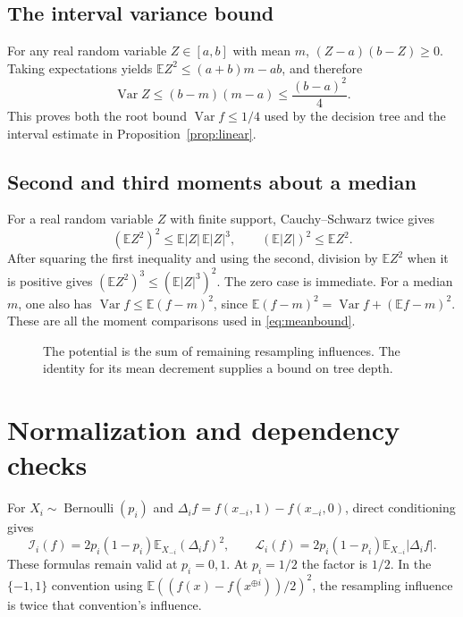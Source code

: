 \documentclass[11pt,reqno]{amsart}
\theoremstyle{definition}
\theoremstyle{remark}
\newcommand{\E}{\mathbb E}
\newcommand{\Var}{\operatorname{Var}}
\newcommand{\cI}{\mathcal I}
\newcommand{\cL}{\mathcal L}
\numberwithin{equation}{section}
\begin{document}
\subsection{The interval variance bound}
For any real random variable $Z\in[a,b]$ with mean $m$,
$(Z-a)(b-Z)\ge0$. Taking expectations yields
$\E Z^2\le(a+b)m-ab$, and therefore
\[
 \Var Z\le(b-m)(m-a)\le\frac{(b-a)^2}{4}.
\]
This proves both the root bound $\Var f\le1/4$ used by the decision tree
and the interval estimate in Proposition~\ref{prop:linear}.

\subsection{Second and third moments about a median}
For a real random variable $Z$ with finite support, Cauchy--Schwarz
twice gives
\[
 (\E Z^2)^2\le\E|Z|\,\E|Z|^3,
 \qquad (\E|Z|)^2\le\E Z^2.
\]
After squaring the first inequality and using the second, division by
$\E Z^2$ when it is positive gives
$(\E Z^2)^3\le(\E|Z|^3)^2$. The zero case is immediate.
For a median $m$, one also has
$\Var f\le\E(f-m)^2$, since
$\E(f-m)^2=\Var f+(\E f-m)^2$.
These are all the moment comparisons used in \eqref{eq:meanbound}.

\begin{figure}[tb]
\centering
{}
\caption{The potential is the sum of remaining resampling influences.
The identity for its mean decrement supplies a bound on tree depth.}
\end{figure}

\section{Normalization and dependency checks}

For $X_i\sim\operatorname{Bernoulli}(p_i)$ and
$\Delta_i f=f(x_{-i},1)-f(x_{-i},0)$, direct conditioning gives
\[
 \cI_i(f)=2p_i(1-p_i)\E_{X_{-i}}(\Delta_i f)^2,
 \qquad\cL_i(f)=2p_i(1-p_i)\E_{X_{-i}}|\Delta_i f|.
\]
These formulas remain valid at $p_i=0,1$. At $p_i=1/2$ the factor is
$1/2$. In the $\{-1,1\}$ convention using
$\E((f(x)-f(x^{\oplus i}))/2)^2$, the resampling influence is twice
that convention's influence.
\end{document}
